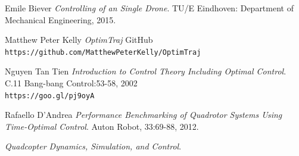 \documentclass[12pt]{article}
\begin{document}
\clearpage



\begin{thebibliography}{9}


Emile Biever
\textit{Controlling of an Single Drone}.
TU/E Eindhoven: Department of Mechanical Engineering, 2015.



Matthew Peter Kelly
\textit{OptimTraj}
GitHub
\\\texttt{https://github.com/MatthewPeterKelly/OptimTraj}


Nguyen Tan Tien
\textit{Introduction to Control Theory Including Optimal Control}.
C.11 Bang-bang Control:53-58, 2002
\\\texttt{https://goo.gl/pj9oyA}



Rafaello D'Andrea
\textit{Performance Benchmarking of Quadrotor Systems Using Time-Optimal Control}.
Auton Robot, 33:69-88, 2012.



\textit{Quadcopter Dynamics, Simulation, and Control}.











\end{thebibliography}


\end{document}
